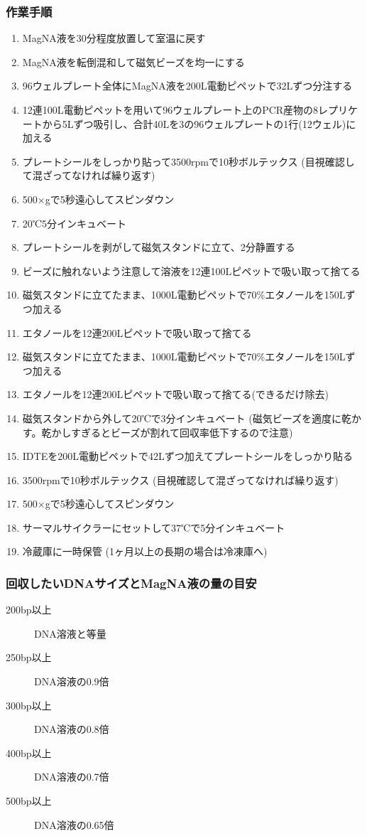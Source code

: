 \documentclass[titlepage,10pt,a4paper,uplatex]{jsbook}
\begin{document}
\subsubsection{作業手順}
\begin{enumerate}
\item MagNA液を30分程度放置して室温に戻す
\item MagNA液を転倒混和して磁気ビーズを均一にする
\item 96ウェルプレート全体にMagNA液を200{\textmu}L電動ピペットで32{\textmu}Lずつ分注する
\item 12連100{\textmu}L電動ピペットを用いて96ウェルプレート上のPCR産物の8レプリケートから5{\textmu}Lずつ吸引し、合計40{\textmu}Lを3の96ウェルプレートの1行(12ウェル)に加える
\item プレートシールをしっかり貼って3500rpmで10秒ボルテックス (目視確認して混ざってなければ繰り返す)
\item 500×gで5秒遠心してスピンダウン
\item 20℃5分インキュベート
\item プレートシールを剥がして磁気スタンドに立て、2分静置する
\item ビーズに触れないよう注意して溶液を12連100{\textmu}Lピペットで吸い取って捨てる
\item 磁気スタンドに立てたまま、1000{\textmu}L電動ピペットで70\%エタノールを150{\textmu}Lずつ加える
\item エタノールを12連200{\textmu}Lピペットで吸い取って捨てる
\item 磁気スタンドに立てたまま、1000{\textmu}L電動ピペットで70\%エタノールを150{\textmu}Lずつ加える
\item エタノールを12連200{\textmu}Lピペットで吸い取って捨てる(できるだけ除去)
\item 磁気スタンドから外して20℃で3分インキュベート (磁気ビーズを適度に乾かす。乾かしすぎるとビーズが割れて回収率低下するので注意)
\item IDTEを200{\textmu}L電動ピペットで42{\textmu}Lずつ加えてプレートシールをしっかり貼る
\item 3500rpmで10秒ボルテックス (目視確認して混ざってなければ繰り返す)
\item 500×gで5秒遠心してスピンダウン
\item サーマルサイクラーにセットして37℃で5分インキュベート
\item 冷蔵庫に一時保管 (1ヶ月以上の長期の場合は冷凍庫へ)
\end{enumerate}

\subsubsection{回収したいDNAサイズとMagNA液の量の目安}
\begin{description}
\item[200bp以上] DNA溶液と等量
\item[250bp以上] DNA溶液の0.9倍
\item[300bp以上] DNA溶液の0.8倍
\item[400bp以上] DNA溶液の0.7倍
\item[500bp以上] DNA溶液の0.65倍
\end{description}
\end{document}

